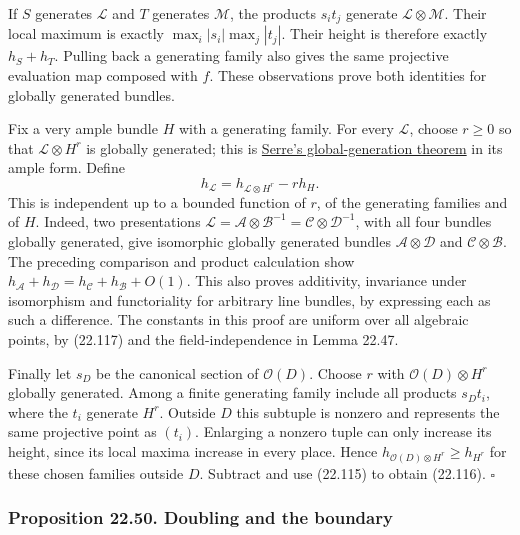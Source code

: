 \documentclass[
  11pt,
  a4paper,
]{article}
\begin{document}
If \(S\) generates \(\mathcal L\) and \(T\) generates \(\mathcal M\),
the products \(s_i t_j\) generate \(\mathcal L\otimes\mathcal M\). Their
local maximum is exactly \(\max_i|s_i|\max_j|t_j|\). Their height is
therefore exactly \(h_S+h_T\). Pulling back a generating family also
gives the same projective evaluation map composed with \(f\). These
observations prove both identities for globally generated bundles.

Fix a very ample bundle \(H\) with a generating family. For every
\(\mathcal L\), choose \(r\ge0\) so that \(\mathcal L\otimes H^r\) is
globally generated; this is
\href{https://kokunoyumeto.github.io/open-math-courses-public/courses/AG-QC/serres-theorems-on-projective-schemes.html\#2-descending-induction-proves-serre-s-theorems}{Serre's
global-generation theorem} in its ample form. Define \[
 h_{\mathcal L}=h_{\mathcal L\otimes H^r}-r h_H.
 \tag{22.118}
\] This is independent up to a bounded function of \(r\), of the
generating families and of \(H\). Indeed, two presentations
\(\mathcal L=\mathcal A\otimes\mathcal B^{-1}=\mathcal C\otimes\mathcal D^{-1}\),
with all four bundles globally generated, give isomorphic globally
generated bundles \(\mathcal A\otimes\mathcal D\) and
\(\mathcal C\otimes\mathcal B\). The preceding comparison and product
calculation show
\(h_{\mathcal A}+h_{\mathcal D}=h_{\mathcal C}+h_{\mathcal B}+O(1)\).
This also proves additivity, invariance under isomorphism and
functoriality for arbitrary line bundles, by expressing each as such a
difference. The constants in this proof are uniform over all algebraic
points, by (22.117) and the field-independence in Lemma 22.47.

Finally let \(s_D\) be the canonical section of \(\mathcal O(D)\).
Choose \(r\) with \(\mathcal O(D)\otimes H^r\) globally generated. Among
a finite generating family include all products \(s_D t_i\), where the
\(t_i\) generate \(H^r\). Outside \(D\) this subtuple is nonzero and
represents the same projective point as \((t_i)\). Enlarging a nonzero
tuple can only increase its height, since its local maxima increase in
every place. Hence \(h_{\mathcal O(D)\otimes H^r}\ge h_{H^r}\) for these
chosen families outside \(D\). Subtract and use (22.115) to obtain
(22.116). \(\square\)

\subsubsection{Proposition 22.50. Doubling and the
boundary}\label{proposition-22.50.-doubling-and-the-boundary}
\end{document}
